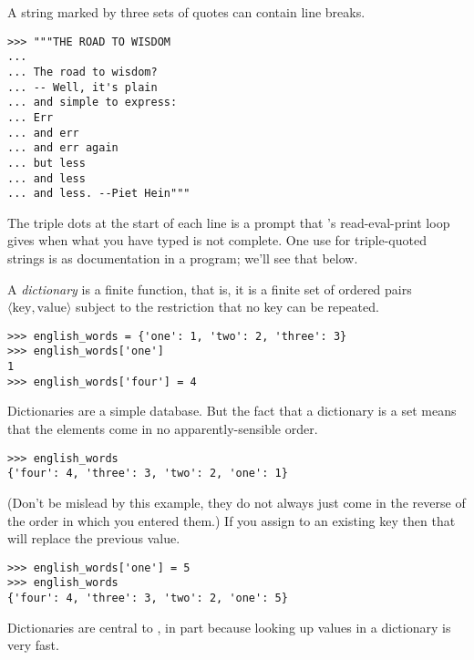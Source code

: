 A string marked by three sets of quotes can contain line breaks.
\begin{lstlisting}[style=python]
>>> """THE ROAD TO WISDOM
... 
... The road to wisdom?
... -- Well, it's plain
... and simple to express:
... Err
... and err
... and err again
... but less
... and less
... and less. --Piet Hein"""
\end{lstlisting}
The triple dots at the start of each line is a prompt that \python's
read-eval-print loop gives when what you have typed is not complete.
One use for triple-quoted strings is as documentation in a program;
we'll see that below.

A \python{} \textit{dictionary} is a finite function, that is, it is a finite
set of ordered pairs $\langle\text{key},\text{value}\rangle$ subject 
to the restriction that no key can be repeated.
\begin{lstlisting}[style=python]
>>> english_words = {'one': 1, 'two': 2, 'three': 3}
>>> english_words['one']
1
>>> english_words['four'] = 4  
\end{lstlisting}
Dictionaries are a simple database.
But the fact that a dictionary is a set means that the elements come in 
no apparently-sensible order.
\begin{lstlisting}[style=python]
>>> english_words
{'four': 4, 'three': 3, 'two': 2, 'one': 1}
\end{lstlisting}
(Don't be mislead by this example, 
they do not always just come in the reverse of the order
in which you entered them.)
If you assign to an existing key then that will replace the previous value. 
\begin{lstlisting}[style=python]
>>> english_words['one'] = 5
>>> english_words
{'four': 4, 'three': 3, 'two': 2, 'one': 5}
\end{lstlisting}
Dictionaries are central to \python, in part because looking up values 
in a dictionary is very fast.

